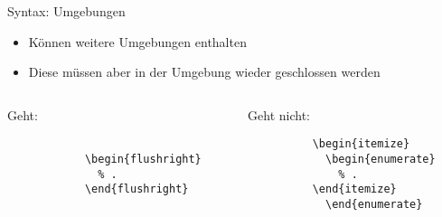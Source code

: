 \begin{frame}[fragile]{Syntax: Umgebungen}
  \begin{itemize}
    \item Können weitere Umgebungen enthalten
    \item Diese müssen aber in der Umgebung wieder geschlossen werden
  \end{itemize}
  \begin{columns}[onlytextwidth, t]
    \begin{column}{0.48\textwidth}
      \begin{block}{Geht:}
        \begin{verbatim}
          
            \begin{flushright}
              % .
            \end{flushright}
          
        \end{verbatim}
      \end{block}
    \end{column}
    \begin{column}{0.48\textwidth}
      \begin{alertblock}{Geht nicht:}
        \begin{verbatim}
          \begin{itemize}
            \begin{enumerate}
              % .
          \end{itemize}
            \end{enumerate}
        \end{verbatim}
      \end{alertblock}
    \end{column}
  \end{columns}
\end{frame}

